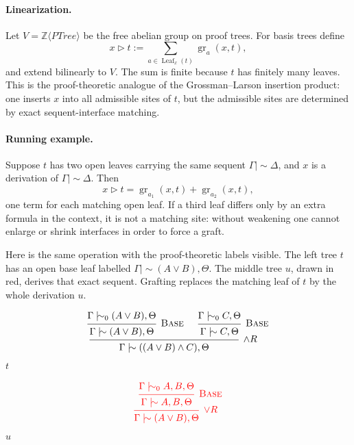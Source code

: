 \documentclass[11pt]{article}
\newcommand{\ms}{\mathrel{\mid\!\sim}}
\newcommand{\mszero}{\mathrel{\mid\!\sim_{0}}}
\newcommand{\PTree}{\mathit{PTree}}
\newcommand{\ZZ}{\mathbb{Z}}
\begin{document}
\paragraph{Linearization.}
Let \(V=\ZZ\langle\PTree\rangle\) be the free abelian group on proof trees.
For basis trees define
\[
x\triangleright t
:=
\sum_{a\in\operatorname{Leaf}_x(t)}
\operatorname{gr}_a(x,t),
\]
and extend bilinearly to \(V\).  The sum is finite because \(t\) has finitely
many leaves.  This is the proof-theoretic analogue of the Grossman--Larson
insertion product: one inserts \(x\) into all admissible sites of \(t\), but
the admissible sites are determined by exact sequent-interface matching.

\paragraph{Running example.}
Suppose \(t\) has two open leaves carrying the same sequent \(\Gamma\ms\Delta\),
and \(x\) is a derivation of \(\Gamma\ms\Delta\).  Then
\[
x\triangleright t
=
\operatorname{gr}_{a_1}(x,t)+\operatorname{gr}_{a_2}(x,t),
\]
one term for each matching open leaf.  If a third leaf differs only by an
extra formula in the context, it is not a matching site: without weakening one
cannot enlarge or shrink interfaces in order to force a graft.

\medskip

\noindent Here is the same operation with the proof-theoretic labels visible.
The left tree \(t\) has an open base leaf labelled
\(\Gamma \ms (A\vee B),\Theta\).  The middle tree \(u\), drawn in red, derives
that exact sequent.  Grafting replaces the matching leaf of \(t\) by the
whole derivation \(u\).

\begin{center}
\begin{minipage}{0.42\textwidth}
\centering
\[
\begin{prooftree}
\hypo{\Gamma \mszero (A\vee B),\Theta}
\infer1[\textsc{Base}]{\Gamma \ms (A\vee B),\Theta}
\hypo{\Gamma \mszero C,\Theta}
\infer1[\textsc{Base}]{\Gamma \ms C,\Theta}
\infer2[\(\wedge R\)]{\Gamma \ms ((A\vee B)\wedge C),\Theta}
\end{prooftree}
\]
\small \(t\)
\end{minipage}
\hfill
\begin{minipage}{0.32\textwidth}
\centering
\[
\begin{prooftree}
\hypo{\Gamma \mszero A,B,\Theta}
\infer1[\textsc{Base}]{\Gamma \ms A,B,\Theta}
\infer1[\(\vee R\)]{\Gamma \ms (A\vee B),\Theta}
\rewrite{\color{red}\box\treebox}
\end{prooftree}
\]
\small \(u\)
\end{minipage}
\end{center}
\end{document}
